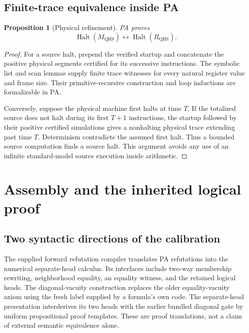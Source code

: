\documentclass[11pt,letterpaper]{article}
\newcommand{\Halt}{\operatorname{Halt}}
\newcommand{\QHS}{M_{\mathrm{QHS}}}
\newtheorem{proposition}[theorem]{Proposition}
\begin{document}
\subsection{Finite-trace equivalence inside PA}

\begin{proposition}[Physical refinement]\label{prop:physical}
PA proves
\[
                 \Halt(\QHS)\leftrightarrow\Halt(R_{\mathrm{QHS}}).
\]
\end{proposition}
\begin{proof}
For a source halt, prepend the verified startup and concatenate the
positive physical segments certified for its successive instructions.
The symbolic list and scan lemmas supply finite trace witnesses for
every natural register value and frame size. Their primitive-recursive
construction and loop inductions are formalizable in PA.

Conversely, suppose the physical machine first halts at time $T$.
If the totalized source does not halt during its first $T+1$ instructions,
the startup followed by their positive certified simulations gives a
nonhalting physical trace extending past time $T$. Determinism
contradicts the assumed first halt. Thus a bounded source computation
finds a source halt. This argument avoids any use of an infinite
standard-model source execution inside arithmetic.
\end{proof}

\section{Assembly and the inherited logical proof}\label{sec:assembly}

\subsection{Two syntactic directions of the calibration}\label{sec:calibration-audit}

The supplied forward refutation compiler translates PA refutations
into the numerical separate-head calculus. Its interfaces include
two-way membership rewriting, neighborhood equality, an equality
witness, and the retained logical heads. The diagonal-vacuity
construction replaces the older equality-vacuity axiom using the
fresh label supplied by a formula's own code. The separate-head
presentation interderives its two heads with the earlier bundled
diagonal gate by uniform propositional proof templates. These are
proof translations, not a claim of external semantic equivalence alone.
\end{document}
